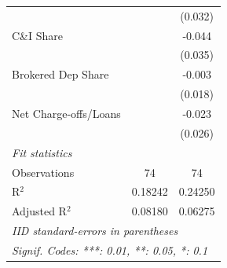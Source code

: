 \begin{tabular}{lcc}
                         &               & (0.032)\\   
   C\&I Share            &               & -0.044\\   
                         &               & (0.035)\\   
   Brokered Dep Share    &               & -0.003\\   
                         &               & (0.018)\\   
   Net Charge-offs/Loans &               & -0.023\\   
                         &               & (0.026)\\   
   \midrule
   \emph{Fit statistics}\\
   Observations          & 74            & 74\\  
   R$^2$                 & 0.18242       & 0.24250\\  
   Adjusted R$^2$        & 0.08180       & 0.06275\\  
   \midrule \midrule
   \multicolumn{3}{l}{\emph{IID standard-errors in parentheses}}\\
   \multicolumn{3}{l}{\emph{Signif. Codes: ***: 0.01, **: 0.05, *: 0.1}}\\
\end{tabular}
\par\endgroup
